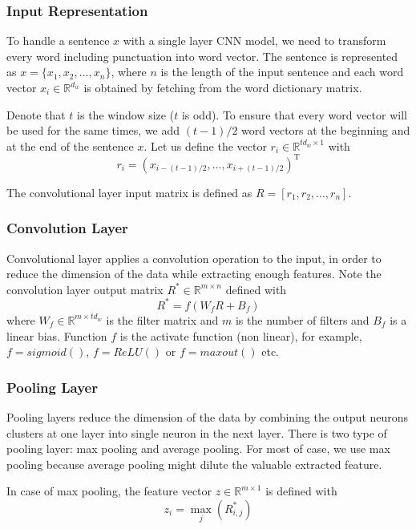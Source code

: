 \documentclass[12pt, a4paper, UTF8]{article}
\begin{document}
	\subsubsection{Input Representation}
	\noindent To handle a sentence $x$ with a single layer CNN model, we need to transform every word including punctuation into word vector. The sentence is represented as $x = \{x_1,x_2,...,x_n\} $, where $n$ is the length of the input sentence and each word vector $x_i \in \mathbb{R}^{d_w}$ is obtained by fetching from the word dictionary matrix.
	\par Denote that $t$ is the window size ($t$ is odd). To ensure that every word vector will be used for the same times, we add $(t-1)/2$ word vectors at the beginning and at the end of the sentence $x$. Let us define the vector $r_i \in \mathbb{R}^{t d_w \times 1}$ with 
	\begin{equation}
	r_i = (x_{i-(t-1)/2},...,x_{i+(t-1)/2})^\mathrm{T}
	\end{equation}
	\par The convolutional layer input matrix is defined as $R = \left[r_1,r_2,...,r_n\right]$.
	
	\subsubsection{Convolution Layer}
	\noindent Convolutional layer applies a convolution operation to the input, in order to reduce the dimension of the data while extracting enough features. Note the convolution layer output matrix $R^* \in \mathbb{R}^{m \times n}$ defined with
	\begin{equation}
	R^* = f(W_f R+B_f)
	\end{equation} 
	where $W_f \in \mathbb{R}^{m \times t d_w}$ is the filter matrix and $m$ is the number of filters and $B_f$ is a linear bias. Function $f$ is the activate function (non linear), for example, $f = sigmoid()$, $f = ReLU()$ or $f = maxout()$ etc.
	
	\subsubsection{Pooling Layer}
	\noindent Pooling layers reduce the dimension of the data by combining the output neurons clusters at one layer into single neuron in the next layer. There is two type of pooling layer: max pooling and average pooling. For most of  case, we use max pooling because average pooling might dilute the valuable extracted feature.
	\par In case of max pooling, the feature vector $z \in \mathbb{R}^{m \times 1}$ is defined with
	\begin{equation}
	z_i = \max_j(R^*_{i,j})
	\end{equation} 
	
\end{document}
